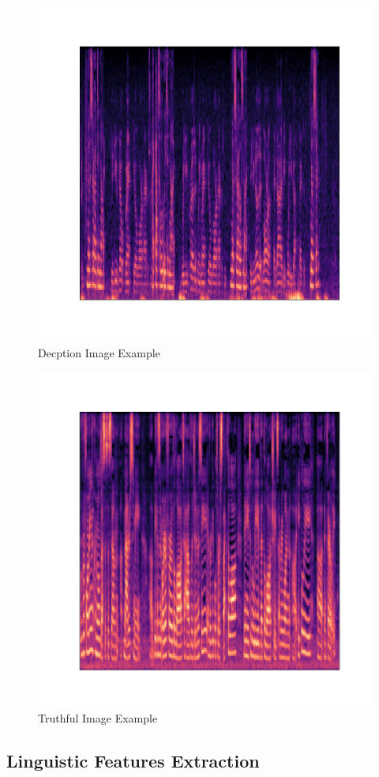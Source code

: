 \documentclass[12pt]{article}
\begin{document}
\begin{figure}[H]
    \centering
    \includegraphics[width=0.5\linewidth]{trial_lie_001.png}
    \caption{Decption Image Example}
    \label{fig:dep}
\end{figure}

\begin{figure}[H]
    \centering
    \includegraphics[width=0.5\linewidth]{trial_truth_001.png}
    \caption{Truthful Image Example}
    \label{fig:truth}
\end{figure}
\subsection{Linguistic Features Extraction}
\label{sec:features}
\end{document}
